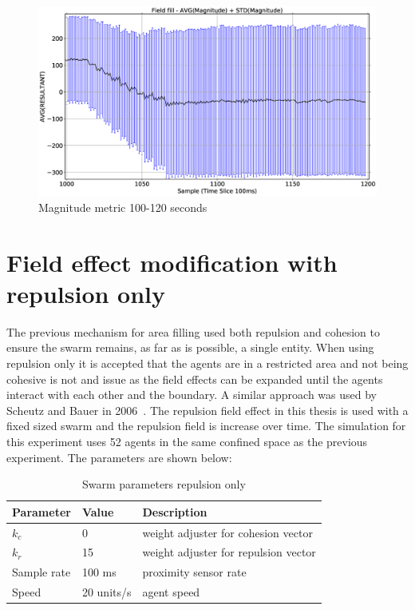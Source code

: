 \begin{figure}[H]
\begin{center}
\includegraphics[width=12cm]{CHAPTER-8/figures/FIELDFILL-MAG-3b}
\end{center}
\caption{Magnitude metric 100-120 seconds\label{emerge:FIELDFILL-MAG-3b}}
\end{figure}

\section{Field effect modification with repulsion only}
The previous mechanism for area filling used both repulsion and cohesion to ensure the swarm remains, as far as is possible, a single entity. When using repulsion only it is accepted that the agents are in a restricted area and not being cohesive is not and issue as the field effects can be expanded until the agents interact with each other and the boundary. A similar approach was used by Scheutz and Bauer in 2006~\cite{SB:06}. The repulsion field effect in this thesis is used with a fixed sized swarm and the repulsion field is increase over time. The simulation for this experiment uses 52 agents in the same confined space as the previous experiment. The parameters are shown below: 

\begin{table}[H]
\begin{center}
\begin{tabular}{| p{2.5cm} | p{2.0cm} | p{6.0cm} |}
\hline
\bf Parameter & \bf Value  & \bf Description \\ \hline
$k_c$         & 0          & weight adjuster for cohesion vector\\ \hline
$k_r$         & 15         & weight adjuster for repulsion vector\\ \hline
Sample rate   & 100 ms      & proximity sensor rate\\ \hline
Speed         & 20 units/s & agent speed\\ \hline
\end{tabular}\caption{Swarm parameters repulsion only} \label{tab:FillParameters}
\end{center}
\end{table}

